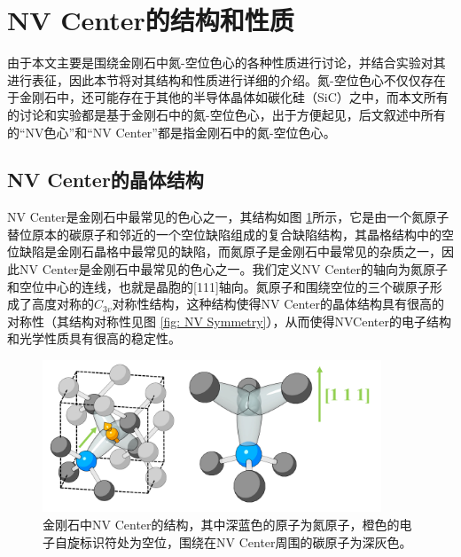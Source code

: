 \documentclass[type = bachelor, oneside]{whu-thesis}
\begin{document}
\section{NV Center的结构和性质}

由于本文主要是围绕金刚石中氮-空位色心的各种性质进行讨论，并结合实验对其进行表征，因此本节将对其结构和性质进行详细的介绍。氮-空位色心不仅仅存在于金刚石中，还可能存在于其他的半导体晶体如碳化硅（SiC）之中，而本文所有的讨论和实验都是基于金刚石中的氮-空位色心，出于方便起见，后文叙述中所有的“NV色心”和“NV Center”都是指金刚石中的氮-空位色心\cite{Bardeleben2015, Csore2017}。

\subsection{NV Center的晶体结构}
NV Center是金刚石中最常见的色心之一，其结构如图 \ref{fig: NV Structure}所示，它是由一个氮原子替位原本的碳原子和邻近的一个空位缺陷组成的复合缺陷结构，其晶格结构中的空位缺陷是金刚石晶格中最常见的缺陷，而氮原子是金刚石中最常见的杂质之一，因此NV Center是金刚石中最常见的色心之一。我们定义NV Center的轴向为氮原子和空位中心的连线，也就是晶胞的[111]轴向。氮原子和围绕空位的三个碳原子形成了高度对称的$C_{3v}$对称性结构，这种结构使得NV Center的晶体结构具有很高的对称性（其结构对称性见图 \ref{fig: NV Symmetry}），从而使得NVCenter的电子结构和光学性质具有很高的稳定性。

\begin{figure}
  \centering
  \includegraphics[width=0.9\textwidth]{figures/Chapter 2/NV Structure.png}
  \caption[金刚石中NV Center的结构]{金刚石中NV Center的结构，其中深蓝色的原子为氮原子，橙色的电子自旋标识符处为空位，围绕在NV Center周围的碳原子为深灰色\cite{Staudacher2015}。}
  \label{fig: NV Structure}
\end{figure}
\end{document}

